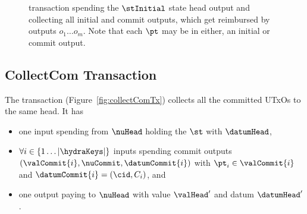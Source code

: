 \begin{figure}
  \centering
  
  \caption{\mtxAbort{} transaction spending the $\stInitial$ state head
	output and collecting all initial and commit outputs, which get reimbursed
	by outputs $o_{1} \dots o_{m}$. Note that each $\pt$ may be in either, an
	initial or commit output.}\label{fig:abortTx}
\end{figure}

\subsection{CollectCom Transaction}\label{sec:collect-tx}

\noindent The \mtxCCom{} transaction (Figure~\ref{fig:collectComTx}) collects
all the committed UTxOs to the same head. It has
\begin{itemize}
  \item one input spending from $\nuHead$ holding the $\st$ with $\datumHead$,
  \item $\forall i \in \{1 \dots |\hydraKeys|\}$ inputs spending commit outputs
  $(\valCommit{i}, \nuCommit, \datumCommit{i})$ with $\pt_{i} \in \valCommit{i}$
  and $\datumCommit{i} = (\cid, C_{i})$, and
  \item one output paying to $\nuHead$ with value $\valHead'$ and
  datum $\datumHead'$.
\end{itemize}

